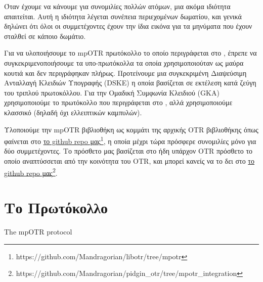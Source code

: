 Όταν έχουμε να κάνουμε για συνομιλίες πολλών ατόμων, μια ακόμα ιδιότητα απαιτείται.
Αυτή η ιδιότητα λέγεται συνέπεια περιεχομένων δωματίου, και γενικά δηλώνει ότι όλοι οι συμμετέχοντες έχουν την ίδια εικόνα για τα μηνύματα που έχουν σταλθεί σε κάποιο δωμάτιο.

Για να υλοποιήσουμε το mpOTR πρωτόκολλο το οποίο περιγράφεται στο \cite{mpotr}, έπρεπε να συγκεκριμενοποιήσουμε τα υπο-πρωτόκολλα τα οποία χρησιμοποιούταν ως μαύρα κουτιά και δεν περιγράφηκαν πλήρως.
Προτείνουμε μια συγκεκριμένη Διαψεύσιμη Ανταλλαγή Κλειδιών Υπογραφής (DSKE) η οποία βασίζεται σε εκτέλεση κατά ζεύγη του τριπλού \dhname πρωτοκόλλου.
Για την Ομαδική Συμφωνία Κλειδιού (GKA) χρησιμοποιούμε το πρωτόκολλο που περιγράφεται στο \cite{mpenc}, αλλά χρησιμοποιούμε κλασσικό \dhname (δηλαδή όχι \dhname ελλειπτικών καμπυλών).

Υλοποιούμε την mpOTR βιβλιοθήκη ως κομμάτι της αρχικής OTR βιβλιοθήκης όπως φαίνεται στο \href{https://github.com/Mandragorian/libotr/tree/mpotr}{το github repo μας\footnote{https://github.com/Mandragorian/libotr/tree/mpotr}}, η οποία μέχρι τώρα πρόσφερε συνομιλίες μόνο για δύο συμμετέχοντες.
Το πρόσθετο μας βασίζεται στο ήδη υπάρχον OTR πρόσθετο το οποίο αναπτύσσεται από την κοινότητα του OTR, και μπορεί κανείς να το δει στο \href{https://github.com/Mandragorian/pidgin_otr/tree/mpotr_integration}{το github repo μας\footnote{https://github.com/Mandragorian/pidgin\_otr/tree/mpotr\_integration}}.

\section{Το Πρωτόκολλο}
\begin{algorithm}[h]
	\caption{The mpOTR protocol}
	\label{mpotr_algo}
\end{algorithm}

